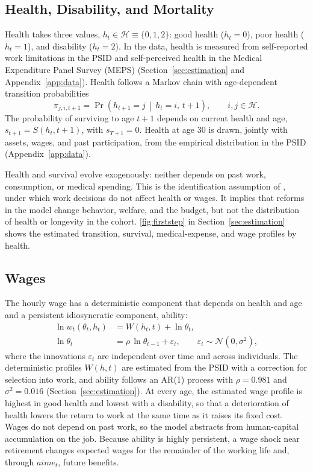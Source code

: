 \subsection{Health, Disability, and Mortality}\label{sec:model_health}

Health takes three values, $h_t\in\mathcal{H}\equiv\{0,1,2\}$: good health ($h_t=0$), poor health ($h_t=1$), and disability ($h_t=2$). In the data, health is measured from self-reported work limitations in the PSID and self-perceived health in the Medical Expenditure Panel Survey (MEPS) (Section~\ref{sec:estimation} and Appendix~\ref{app:data}). Health follows a Markov chain with age-dependent transition probabilities
\begin{equation*}
\pi_{j,i,t+1}=\Pr\left(h_{t+1}=j \,\middle|\, h_t=i,\, t+1\right), \qquad i,j\in\mathcal{H}.
\end{equation*}
The probability of surviving to age $t+1$ depends on current health and age, $s_{t+1}=S(h_t,t+1)$, with $s_{T+1}=0$. Health at age 30 is drawn, jointly with assets, wages, and past participation, from the empirical distribution in the PSID (Appendix~\ref{app:data}).

Health and survival evolve exogenously: neither depends on past work, consumption, or medical spending. This is the identification assumption of \citet{french2005effects}, under which work decisions do not affect health or wages. It implies that reforms in the model change behavior, welfare, and the budget, but not the distribution of health or longevity in the cohort. \autoref{fig:firststep} in Section~\ref{sec:estimation} shows the estimated transition, survival, medical-expense, and wage profiles by health.

\subsection{Wages}\label{sec:model_wages}

The hourly wage has a deterministic component that depends on health and age and a persistent idiosyncratic component, ability:
\begin{align}
\ln w_t(\theta_t,h_t)&=W(h_t,t)+\ln\theta_t, \label{eq:wage}\\
\ln\theta_t&=\rho\,\ln\theta_{t-1}+\varepsilon_t, \qquad \varepsilon_t\sim\mathcal{N}(0,\sigma^2), \label{eq:ability}
\end{align}
where the innovations $\varepsilon_t$ are independent over time and across individuals. The deterministic profiles $W(h,t)$ are estimated from the PSID with a correction for selection into work, and ability follows an AR(1) process with $\rho=0.981$ and $\sigma^2=0.016$ (Section~\ref{sec:estimation}). At every age, the estimated wage profile is highest in good health and lowest with a disability, so that a deterioration of health lowers the return to work at the same time as it raises its fixed cost. Wages do not depend on past work, so the model abstracts from human-capital accumulation on the job. Because ability is highly persistent, a wage shock near retirement changes expected wages for the remainder of the working life and, through $aime_t$, future benefits.


